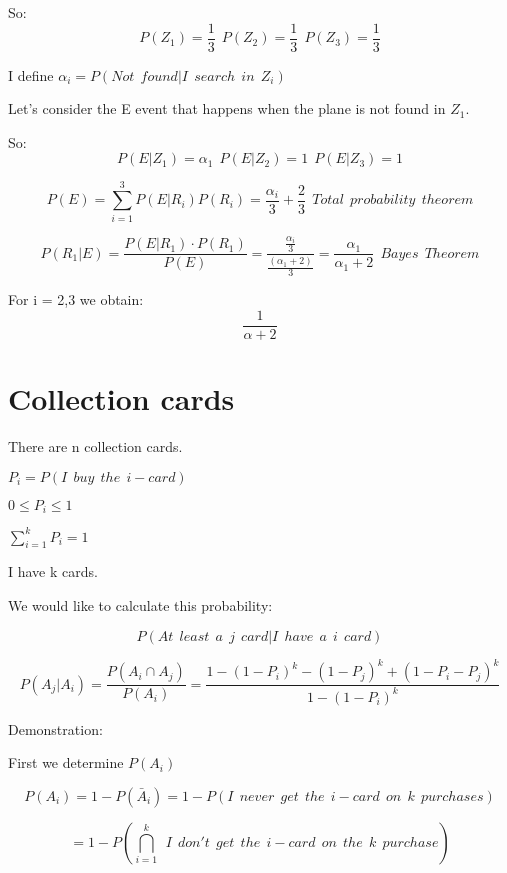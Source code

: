 \documentclass{article}
\begin{document}
\bigskip

So: $$P(Z_1) = \frac{1}{3} \ \ P(Z_2) = \frac{1}{3} \ \ P(Z_3) = \frac{1}{3}$$

\bigskip

I define $\alpha_i = P(Not \ \ found| I \ \ search \ \ in \ \ Z_i)$

\bigskip

Let's consider the E event that happens when the plane is not found in $Z_1$.

\bigskip

So: $$ P(E|Z_1) = \alpha_1 \ \ P(E|Z_2) = 1 \ \ P(E|Z_3) = 1$$ 


$$P(E) = \sum_{i=1}^3 P(E|R_i)P(R_i) = \frac{\alpha_i}{3} + \frac{2}{3} \ \ Total \ \ probability \ \ theorem$$

$$P(R_1|E) = \frac{P(E| R_1) \cdot P(R_1)}{P(E)} =  \frac{\frac{\alpha_i}{3}}{\frac{(\alpha_1 + 2)}{3}} = \frac{\alpha_1}{\alpha_1 + 2} \ \ Bayes \ \ Theorem$$

For i = 2,3 we obtain: $$\frac{1}{\alpha + 2}$$ 

\section{Collection cards}

There are n collection cards. 

$P_i = P(I \ \ buy \ \ the \ \ i-card)$

\bigskip

$0 \leq P_i \leq 1$

\bigskip

$\sum_{i=1}^k P_i = 1$

\bigskip

I have k cards.

We would like to calculate this probability:

$$P(At \ \ least \ \ a \ \ j \ \ card | I \ \ have \ \ a \ \ i \ \ card)$$

$$P(A_j | A_i ) = \frac{P(A_i \cap A_j)}{P(A_i)} = \frac{1 - (1 - P_i)^k - (1 - P_j)^k + (1 - P_i - P_j)^k}{1 - (1 - P_i)^k}$$

Demonstration: 

\bigskip

First we determine $P(A_i)$

$$P(A_i) = 1 - P(\bar A_i) = 1 - P(I \ \ never \ \ get \ \ the \ \ i-card \ \ on \ \ k \ \ purchases)$$

$$= 1 - P(\bigcap_{i=1}^k \ \ I \ \ don't \ \ get \ \ the \ \ i-card \ \ on \ \ the \ \ k \ \ purchase)$$
\end{document}

